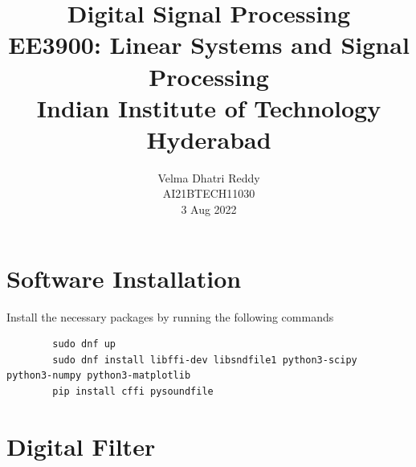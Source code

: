 \documentclass[journal,12pt,twocolumn]{IEEEtran}
\title{Digital Signal Processing \\ \Large EE3900: Linear Systems and Signal Processing \\ \large Indian Institute of Technology Hyderabad}
\author{Velma Dhatri Reddy \\ \normalsize AI21BTECH11030 \\ \vspace*{10pt} \normalsize 3 Aug 2022}
\numberwithin{equation}{section}
\begin{document}
	\maketitle
	
	\section{Software Installation}
	Install the necessary packages by running the following commands
	\begin{lstlisting}
		sudo dnf up
		sudo dnf install libffi-dev libsndfile1 python3-scipy  python3-numpy python3-matplotlib 
		pip install cffi pysoundfile 
	\end{lstlisting}

	\section{Digital Filter}
\end{document}
